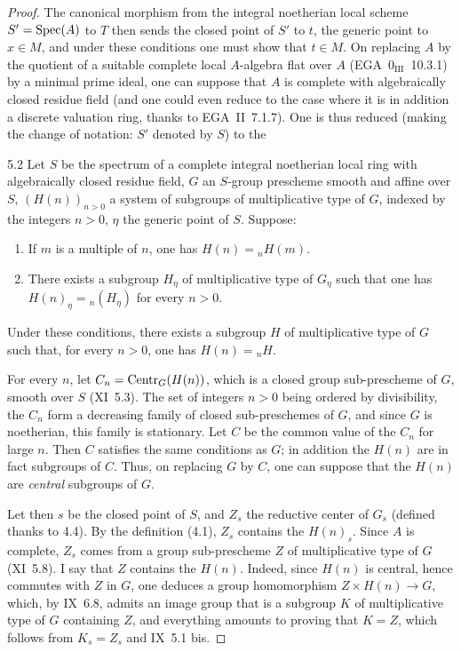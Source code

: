 \begin{proof}
The canonical morphism from the integral noetherian local scheme $S'=\operatorname{Spec}(A)$ to $T$ then sends the closed point of $S'$ to $t$, the generic point to $x\in M$, and under these conditions one must show that $t\in M$. On replacing $A$ by the quotient of a suitable complete local $A$-algebra flat over $A$ (EGA~$0_{\mathrm{III}}$~10.3.1) by a minimal prime ideal, one can suppose that $A$ is complete with algebraically closed residue field (and one could even reduce to the case where it is in addition a discrete valuation ring, thanks to EGA~II~7.1.7). One is thus reduced (making the change of notation: $S'$ denoted by $S$) to the
\begin{lemma}{5.2}\label{XII.5.2}
Let $S$ be the spectrum of a complete integral noetherian local ring with algebraically closed residue field, $G$ an $S$-group prescheme smooth and affine over $S$, $(H(n))_{n>0}$ a system of subgroups of multiplicative type of $G$, indexed by the integers $n>0$, $\eta$ the generic point of $S$. Suppose:
\begin{enumerate}[label=\alph*)]
\item If $m$ is a multiple of $n$, one has $H(n)={}_nH(m)$.
\item There exists a subgroup $H_\eta$ of multiplicative type of $G_\eta$ such that one has $H(n)_\eta={}_n(H_\eta)$ for every $n>0$.
\end{enumerate}
Under these conditions, there exists a subgroup $H$ of multiplicative type of $G$ such that, for every $n>0$, one has $H(n)={}_nH$.
\end{lemma}
For every $n$, let $C_n=\operatorname{Centr}_G(H(n))$, which is a closed group sub-prescheme of $G$, smooth over $S$ (XI~5.3). The set of integers $n>0$ being ordered by divisibility, the $C_n$ form a decreasing family of closed sub-preschemes of $G$, and since $G$ is noetherian, this family is stationary. Let $C$ be the common value of the $C_n$ for large $n$. Then $C$ satisfies the same conditions as $G$; in addition the $H(n)$ are in fact subgroups of $C$. Thus, on replacing $G$ by $C$, one can suppose that the $H(n)$ are \emph{central} subgroups of $G$.

Let then $s$ be the closed point of $S$, and $Z_s$ the reductive center of $G_s$ (defined thanks to 4.4). By the definition (4.1), $Z_s$ contains the $H(n)_s$. Since $A$ is complete, $Z_s$ comes from a group sub-prescheme $Z$ of multiplicative type of $G$ (XI~5.8). I say that $Z$ contains the $H(n)$. Indeed, since $H(n)$ is central, hence commutes with $Z$ in $G$, one deduces a group homomorphism $Z\times H(n)\to G$, which, by IX~6.8, admits an image group that is a subgroup $K$ of multiplicative type of $G$ containing $Z$, and everything amounts to proving that $K=Z$, which follows from $K_s=Z_s$ and IX~5.1 bis.


\end{proof}
